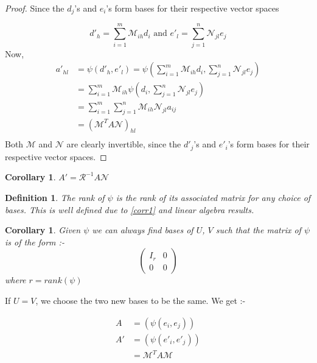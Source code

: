 \documentclass{notes}
\theoremstyle{plain}
\newtheorem{corollary}[theorem]{Corollary}
\newtheorem{definition}[theorem]{Definition}
\begin{document}
\begin{proof}
  
  Since the $d_{j}$'s and $e_{i}$'s form bases for their respective
  vector spaces

\[
d'_{h} = \sum_{i=1}^{m}\mathcal{M}_{ih}d_{i} \text{ and } e'_{l} =
\sum_{j=1}^{n}\mathcal{N}_{jl}e_{j}
\]
Now,
\begin{align*}
  a'_{hl} &= \psi (d'_h,e'_l) = \psi \left(\sum_{i=1}^{m}\mathcal{M}_{ih}d_{i},\sum_{j=1}^{n}\mathcal{N}_{jl}e_{j}\right) \\
  &=\sum_{i=1}^{m}\mathcal{M}_{ih}\psi \left(d_i,\sum_{j=1}^{n}\mathcal{N}_{jl}e_{j}\right)\\
  &=\sum_{i=1}^{m}\sum_{j=1}^{n}\mathcal{M}_{ih}\mathcal{N}_{jl}a_{ij}\\
  &=\left(\mathcal{M}^{T}A\mathcal{N} \right)_{hl}\\
\end{align*}
Both $\mathcal{M}$ and $\mathcal{N}$ are clearly invertible, since the
$d'_{j}$'s and $e'_{i}$'s form bases for their respective vector
spaces.
\end{proof}

\begin{corollary}\label{corr1}
  $A' = \mathcal{R}^{-1}A\mathcal{N}$
\end{corollary}

\begin{definition}
  The rank of $\psi$ is the rank of its associated matrix for any
  choice of bases.  This is well defined due to \eqref{corr1} and
  linear algebra results.
\end{definition}

\begin{corollary}
  Given $\psi$ we can always find bases of $U$, $V$ such that the
  matrix of $\psi$ is of the form :-
\[
\left(
\begin{matrix}
  I_r & 0 \\
  0 & 0
\end{matrix}
\right)
\]
where $r = rank(\psi)$
\end{corollary}

If $U=V$, we choose the two new bases to be the same.  We get :-

\begin{align*}
  A &= \left(\psi(e_i,e_j)\right) \\
  A' &= \left(\psi(e'_i,e'_j)\right) \\
  &= \mathcal{M}^{T}A\mathcal{M}
\end{align*}
\end{document}
